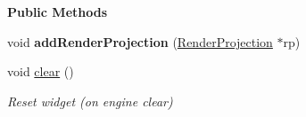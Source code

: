 \begin{Indent}\textbf{ Public Methods}\par
\begin{DoxyCompactItemize}
\item 
\mbox{\label{classrev_1_1_view_1_1_g_l_widget_a0e760fd647e92d2415f0763e81c580dd}} 
void {\bfseries add\+Render\+Projection} (\mbox{\hyperlink{classrev_1_1_render_projection}{Render\+Projection}} $\ast$rp)
\item 
\mbox{\label{classrev_1_1_view_1_1_g_l_widget_a34e97aa50cbe69e4236d007a2bf2fe47}} 
void \mbox{\hyperlink{classrev_1_1_view_1_1_g_l_widget_a34e97aa50cbe69e4236d007a2bf2fe47}{clear}} ()
\begin{DoxyCompactList}\small\item\em Reset widget (on engine clear) \end{DoxyCompactList}\end{DoxyCompactItemize}
\end{Indent}
